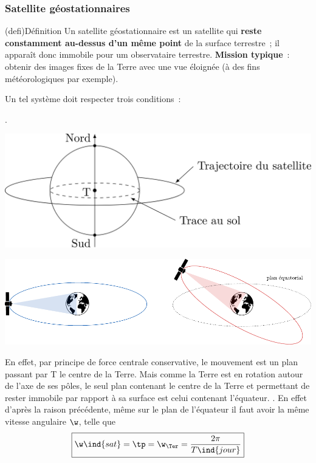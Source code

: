 \documentclass[../../main/main.tex]{subfiles}
\begin{document}
\subsubsection{Satellite géostationnaires}
\begin{tcb*}[sidebyside](defi){Définition}
	Un satellite géostationnaire est un satellite qui \textbf{reste constamment
		au-dessus d'un même point} de la surface terrestre~; il apparaît donc
	immobile pour um observataire terrestre.
  \tcblower
  \textbf{Mission typique}~: obtenir des images fixes de la Terre avec une vue
  éloignée (à des fins météorologiques par exemple).
\end{tcb*}
Un tel système doit respecter trois conditions~:
\begin{enumerate}
	.
  \smallbreak
    \begin{isd}
      \begin{center}
        \includegraphics[width=\linewidth]{sat_geo}
      \end{center}
      \tcblower
      \begin{center}
        \includegraphics[width=\linewidth]{sat_geo_plan}
      \end{center}
    \end{isd}
	      En effet, par principe de force centrale conservative, le mouvement est
	      un plan passant par T le centre de la Terre. Mais comme la Terre est en
	      rotation autour de l'axe de ses pôles, le seul plan contenant le centre
	      de la Terre et permettant de rester immobile par rapport à sa surface
	      est celui contenant l'équateur.
	. En effet d'après la raison précédente, même sur le plan de
	      l'équateur il faut avoir la même vitesse angulaire $\w$, telle que
	      \[\boxed{\w\ind{sat} = \tp = \w_\Ter = \frac{2\pi}{T\ind{jour}}}\]
\end{enumerate}
\end{document}
